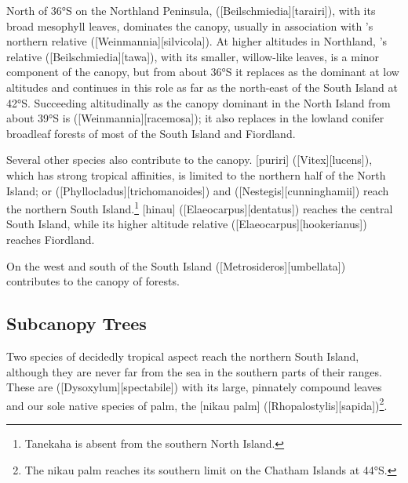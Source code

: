 North of \ang{36}S on the Northland Peninsula,  ([Beilschmiedia][tarairi]), with its broad mesophyll leaves, dominates the canopy, usually in association with 's northern relative  ([Weinmannia][silvicola]).
At higher altitudes in Northland, 's relative  ([Beilschmiedia][tawa]), with its smaller, willow-like leaves, is a minor component of the canopy, but from about \ang{36}S it replaces  as the dominant at low altitudes and continues in this role as far as the north-east of the South Island at \ang{42}S.
Succeeding  altitudinally as the canopy dominant in the North Island from about \ang{39}S is  ([Weinmannia][racemosa]); it also replaces  in the lowland conifer broadleaf forests of most of the South Island and Fiordland.

Several other species also contribute to the canopy.
[puriri] ([Vitex][lucens]), which has strong tropical affinities, is limited to the northern half of the North Island;  or  ([Phyllocladus][trichomanoides]) and  ([Nestegis][cunninghamii]) reach the northern South Island.\footnote{Tanekaha is absent from the southern North Island.}
[hinau] ([Elaeocarpus][dentatus]) reaches the central South Island, while its higher altitude relative  ([Elaeocarpus][hookerianus]) reaches Fiordland.

On the west and south of the South Island  ([Metrosideros][umbellata]) contributes to the canopy of  forests.

\subsection{Subcanopy Trees}

Two species of decidedly tropical aspect reach the northern South Island, although they are never far from the sea in the southern parts of their ranges.
These are  ([Dysoxylum][spectabile]) with its large, pinnately compound leaves and our sole native species of palm, the [nikau palm] ([Rhopalostylis][sapida])\footnote{The nikau palm reaches its southern limit on the Chatham Islands at \ang{44}S.}.

